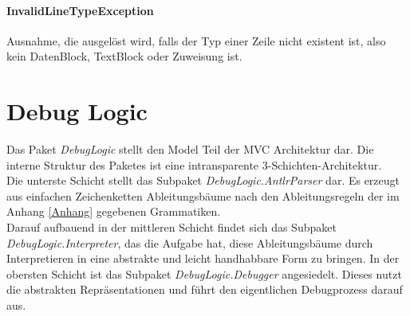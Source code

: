 \documentclass[parskip=full]{scrartcl}
\begin{document}
\paragraph{InvalidLineTypeException}
Ausnahme, die ausgelöst wird, falls der Typ einer Zeile nicht existent ist, also kein DatenBlock, TextBlock oder Zuweisung ist.


\section{Debug Logic}
Das Paket \textit{DebugLogic} stellt den Model Teil der MVC Architektur dar. Die interne Struktur des Paketes ist eine intransparente 3-Schichten-Architektur.\\
Die unterste Schicht stellt das Subpaket \textit{DebugLogic.AntlrParser} dar. Es erzeugt aus einfachen Zeichenketten Ableitungsbäume nach den Ableitungsregeln der im Anhang \ref{Anhang} gegebenen Grammatiken.\\ Darauf aufbauend in der mittleren Schicht findet sich das Subpaket \textit{DebugLogic.Interpreter}, das die Aufgabe hat, diese Ableitungsbäume durch Interpretieren in eine abstrakte und leicht handhabbare Form zu bringen. In der obersten Schicht ist das Subpaket \textit{DebugLogic.Debugger} angesiedelt. Dieses nutzt die abstrakten Repräsentationen und führt den eigentlichen Debugprozess darauf aus.
\end{document}
